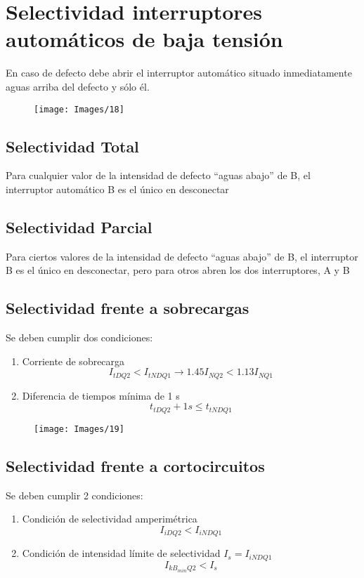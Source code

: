 \chapter{Selectividad interruptores automáticos de baja tensión}
En caso de defecto debe abrir el interruptor automático situado inmediatamente aguas arriba del defecto y sólo él.
\begin{figure}[H]
	\centering
	\texttt{[image: Images/18]}
\end{figure}
\section{Selectividad Total}
Para cualquier valor de la intensidad de defecto “aguas abajo” de B, el interruptor automático B es el único en desconectar 
\section{Selectividad Parcial}
Para ciertos valores de la intensidad de defecto “aguas abajo” de B, el interruptor B es el único en desconectar, pero para otros abren los dos interruptores, A y B
\section{Selectividad frente a sobrecargas}
Se deben cumplir dos condiciones:
\begin{enumerate}
	\item Corriente de sobrecarga
	\begin{equation}
		I_{tDQ2}< I_{tNDQ1} \rightarrow 1.45 I_{NQ2} < 1.13 I_{NQ1}
	\end{equation}
	\item Diferencia de tiempos mínima de 1 s
	\begin{equation}
		t_{tDQ2}+1s\le t_{tNDQ1}
	\end{equation}
\end{enumerate}
\begin{figure}[H]
	\centering
	\texttt{[image: Images/19]}
\end{figure}

\section{Selectividad frente a cortocircuitos}
Se deben cumplir 2 condiciones:
\begin{enumerate}
	\item Condición de selectividad amperimétrica
	\begin{equation}
		I_{iDQ2}< I_{iNDQ1} 
	\end{equation}
	\item Condición de intensidad límite de selectividad $I_s=I_{iNDQ1}$
	\begin{equation}
		I_{kB_{min}Q2}< I_s
	\end{equation}
\end{enumerate}

